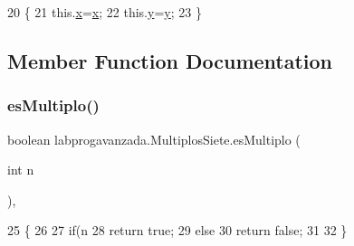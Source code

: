 \begin{DoxyCode}
20                                        \{
21         this.\mbox{\hyperlink{classlabprogavanzada_1_1_multiplos_siete_a66b1e8aa9e692a515ca3b2e6a8f9e46f}{x}}=\mbox{\hyperlink{classlabprogavanzada_1_1_multiplos_siete_a66b1e8aa9e692a515ca3b2e6a8f9e46f}{x}};
22         this.\mbox{\hyperlink{classlabprogavanzada_1_1_multiplos_siete_a9e6209ca44e838aa9e618a6487f0041f}{y}}=\mbox{\hyperlink{classlabprogavanzada_1_1_multiplos_siete_a9e6209ca44e838aa9e618a6487f0041f}{y}};
23     \}
\end{DoxyCode}


\subsection{Member Function Documentation}
\mbox{\label{classlabprogavanzada_1_1_multiplos_siete_a586194f8ac6f470f06348ba0868f0c76}} 
\subsubsection{\texorpdfstring{es\+Multiplo()}{esMultiplo()}}
{\footnotesize\ttfamily boolean labprogavanzada.\+Multiplos\+Siete.\+es\+Multiplo (\begin{DoxyParamCaption}\item[{int}]{n }\end{DoxyParamCaption})\hspace{0.3cm}{\ttfamily [inline]}, {\ttfamily [private]}}


\begin{DoxyCode}
25                                      \{
26         
27         \textcolor{keywordflow}{if}(n%
28             \textcolor{keywordflow}{return} \textcolor{keyword}{true};
29         \textcolor{keywordflow}{else}
30             \textcolor{keywordflow}{return} \textcolor{keyword}{false};
31         
32     \}
\end{DoxyCode}
\mbox{\label{classlabprogavanzada_1_1_multiplos_siete_acd03b73ae24d21f7a3c2aeb84f4a0ef1}} 
